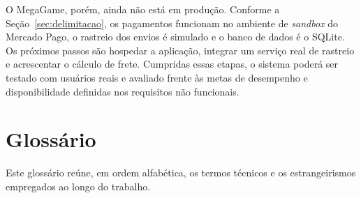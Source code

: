 \documentclass[
  12pt,
  a4paper,
  oneside,
  chapter=TITLE,
  subsection=TITLE,
  sumario=abnt-6027-2012,
  english,
  brazil
]{abntex2}
\begin{document}
O MegaGame, porém, ainda não está em produção. Conforme a
Seção~\ref{sec:delimitacao}, os pagamentos funcionam no ambiente de
\emph{sandbox} do Mercado Pago, o rastreio dos envios é simulado e o
banco de dados é o SQLite. Os próximos passos são hospedar a aplicação, 
integrar um serviço real de rastreio e acrescentar o cálculo de frete.
Cumpridas essas etapas, o sistema poderá ser testado com usuários reais
e avaliado frente às metas de desempenho e disponibilidade definidas nos
requisitos não funcionais.

\postextual



\chapter*{Glossário}

Este glossário reúne, em ordem alfabética, os termos técnicos e os
estrangeirismos empregados ao longo do trabalho.
\end{document}
